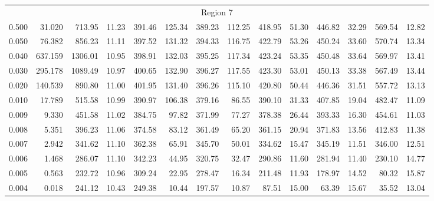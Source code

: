 \begin{tabular}{@{}lrrrrrrrrrrrrr@{}}
\midrule
\multicolumn{14}{c}{Region 7} \\
\cmidrule{1-14}
0.500 & 31.020 & 713.95 & 11.23 & 391.46 & 125.34 & 389.23 & 112.25 & 418.95 & 51.30 & 446.82 & 32.29 & 569.54 & 12.82 \\
0.050 & 76.382 & 856.23 & 11.11 & 397.52 & 131.32 & 394.33 & 116.75 & 422.79 & 53.26 & 450.24 & 33.60 & 570.74 & 13.34 \\
0.040 & 637.159 & 1306.01 & 10.95 & 398.91 & 132.03 & 395.25 & 117.34 & 423.24 & 53.35 & 450.48 & 33.64 & 569.97 & 13.41 \\
0.030 & 295.178 & 1089.49 & 10.97 & 400.65 & 132.90 & 396.27 & 117.55 & 423.30 & 53.01 & 450.13 & 33.38 & 567.49 & 13.44 \\
0.020 & 140.539 & 890.80 & 11.00 & 401.95 & 131.40 & 396.26 & 115.10 & 420.80 & 50.44 & 446.36 & 31.51 & 557.72 & 13.13 \\
0.010 & 17.789 & 515.58 & 10.99 & 390.97 & 106.38 & 379.16 & 86.55 & 390.10 & 31.33 & 407.85 & 19.04 & 482.47 & 11.09 \\
0.009 & 9.330 & 451.58 & 11.02 & 384.75 & 97.82 & 371.99 & 77.27 & 378.38 & 26.44 & 393.33 & 16.30 & 454.61 & 11.03 \\
0.008 & 5.351 & 396.23 & 11.06 & 374.58 & 83.12 & 361.49 & 65.20 & 361.15 & 20.94 & 371.83 & 13.56 & 412.83 & 11.38 \\
0.007 & 2.942 & 341.62 & 11.10 & 362.38 & 65.91 & 345.70 & 50.01 & 334.62 & 15.47 & 345.19 & 11.51 & 346.00 & 12.51 \\
0.006 & 1.468 & 286.07 & 11.10 & 342.23 & 44.95 & 320.75 & 32.47 & 290.86 & 11.60 & 281.94 & 11.40 & 230.10 & 14.77 \\
0.005 & 0.563 & 232.72 & 10.96 & 309.24 & 22.95 & 278.47 & 16.34 & 211.48 & 11.93 & 178.97 & 14.52 & 80.32 & 15.87 \\
0.004 & 0.018 & 241.12 & 10.43 & 249.38 & 10.44 & 197.57 & 10.87 & 87.51 & 15.00 & 63.39 & 15.67 & 35.52 & 13.04 \\

\bottomrule
\end{tabular}
